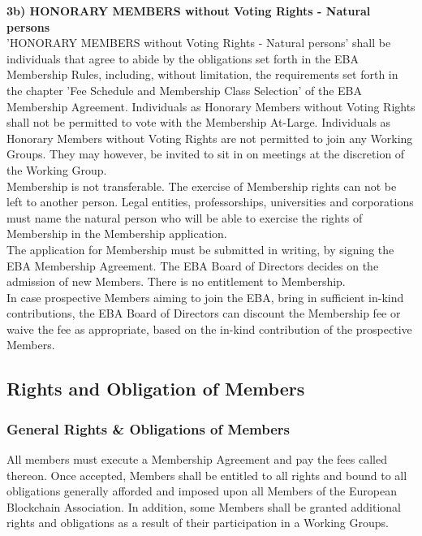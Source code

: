 \documentclass{article}
\begin{document}
\textbf{3b) HONORARY MEMBERS without Voting Rights - Natural persons} \\

'HONORARY MEMBERS without Voting Rights - Natural persons' shall be individuals that agree to abide by the obligations set forth in the EBA Membership Rules, including, without limitation, the requirements set forth in the chapter 'Fee Schedule and Membership Class Selection' of the EBA Membership Agreement. 
Individuals as Honorary  Members without Voting Rights shall not be permitted to vote with the Membership At-Large. Individuals as Honorary Members without Voting Rights are not permitted to join any Working Groups. They may however, be invited to sit in on meetings at the discretion of the Working Group. \\

Membership is not transferable. 
The exercise of Membership rights can not be left to another person. Legal entities, professorships, universities and corporations must name the natural person who will be able to exercise the rights of Membership in the Membership application. \\ 

The application for Membership must be submitted in writing, by signing the EBA Membership Agreement. The EBA Board of Directors decides on the admission of new Members. There is no entitlement to Membership. \\

In case prospective Members aiming to join the EBA, bring in sufficient in-kind contributions, the EBA Board of Directors can discount the Membership fee or waive the fee as appropriate, based on the in-kind contribution of the prospective Members.

\subsection{Rights and Obligation of Members}

\subsubsection{General Rights \& Obligations of Members}

All members must execute a Membership Agreement and pay the fees called thereon. 
Once accepted, Members shall be entitled to all rights and bound to all obligations generally afforded and imposed upon all Members of the European Blockchain Association. 
In addition, some Members shall be granted additional rights and obligations as a result of their participation in a Working Groups. \\
\end{document}
